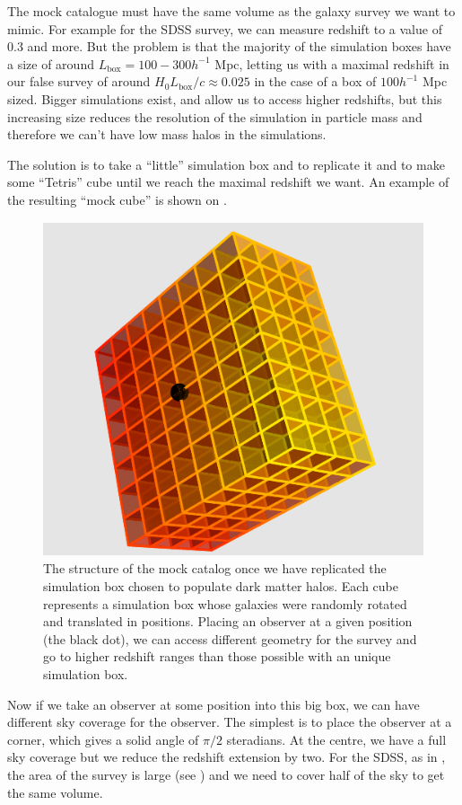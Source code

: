 The mock catalogue must have the same volume as the galaxy survey we want to
mimic. For example for the SDSS survey, we can measure redshift to a value of
0.3 and more. But the problem is that the majority of the simulation boxes have
a size of around $L_{\mathrm{box}}=100-300 h^{-1}$ Mpc, letting us with a
maximal redshift in our false survey of around
${H_0}{L_{\mathrm{box}}}/c\approx 0.025$ in the case of a box of $100 h^{-1}$
Mpc sized. Bigger simulations exist, and allow us to access higher redshifts,
but this increasing size reduces the resolution of the simulation in particle
mass and therefore we can't have low mass halos in the simulations.

The solution is to take a ``little'' simulation box and to replicate it and to
make some ``Tetris'' cube until we reach the maximal redshift we want. An
example of the resulting ``mock cube'' is shown on .
%
\begin{figure}[htb]
    \centering
    \includegraphics[width=0.5\linewidth]{figures/mock/mock}
    \caption{The structure of the mock catalog once we have replicated the
        simulation box chosen to populate dark matter halos. Each cube
        represents a simulation box whose galaxies were randomly rotated and
        translated in positions. Placing an observer at a given position (the
    black dot), we can access different geometry for the survey and go to
higher redshift ranges than those possible with an unique simulation
box.\label{fig:cubemock}}%
\end{figure}

Now if we take an observer at some position into this big box, we can have
different sky coverage for the observer. The simplest is to place the observer
at a corner, which gives a solid angle of $\pi/2$ steradians. At the centre,
we have a full sky coverage but we reduce the redshift extension by two. For
the SDSS, as in , the area of the survey is large (see
) and we need to cover half of the sky to get the same
volume.

